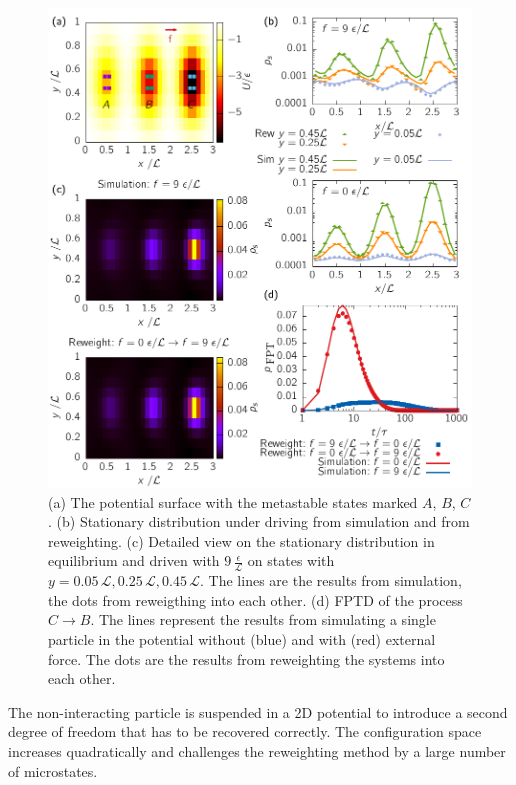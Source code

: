 \begin{figure}
\vspace{-0cm}
\centering
 \includegraphics{../plots/Urew/single_5010.pdf}
 \caption[Potential surface, stationary distribution and first-passage time distribution of a chosen process for the 2D driven system]{(a) The potential surface with the metastable states marked $A$, $B$, $C$. (b) Stationary distribution under driving from simulation and from reweighting. (c) Detailed view on the stationary distribution in equilibrium and driven with $9\,\frac{\epsilon}{\mathcal{L}}$ on states with $y=0.05\,\mathcal{L}, 0.25\,\mathcal{L}, 0.45\,\mathcal{L}$. The lines are the results from simulation, the dots from reweigthing into each other. (d) FPTD of the process $ C \rightarrow B$. The lines represent the results from simulating a single particle in the potential without (blue) and with (red) external force. The dots are the results from reweighting the systems into each other.  }
 \label{fig:pot2D}
\end{figure} 

The non-interacting particle is suspended in a 2D potential to introduce a second degree of freedom that has to be recovered correctly. The configuration space increases quadratically and challenges the reweighting method by a large number of microstates. 

